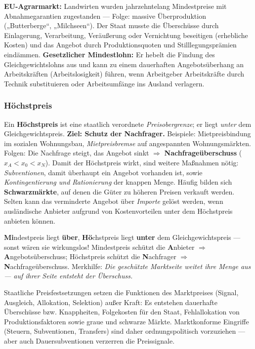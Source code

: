 \documentclass[11pt, a4paper]{article}
\begin{document}
\begin{beispiel}
\textbf{EU-Agrarmarkt:} Landwirten wurden jahrzehntelang Mindestpreise mit
Abnahmegarantien zugestanden --- Folge: massive Überproduktion („Butterberge``,
„Milchseen``). Der Staat musste die Überschüsse durch Einlagerung, Verarbeitung,
Veräußerung oder Vernichtung beseitigen (erhebliche Kosten) und das Angebot durch
Produktionsquoten und Stilllegungsprämien eindämmen.
\textbf{Gesetzlicher Mindestlohn:} Er hebelt die Findung des Gleichgewichtslohns aus und
kann zu einem dauerhaften Angebotsüberhang an Arbeitskräften (Arbeitslosigkeit) führen,
wenn Arbeitgeber Arbeitskräfte durch Technik substituieren oder Arbeitsumfänge ins
Ausland verlagern.
\end{beispiel}

\subsubsection{Höchstpreis}

Ein \textbf{Höchstpreis} ist eine staatlich verordnete \emph{Preisobergrenze}; er liegt
\emph{unter} dem Gleichgewichtspreis. \textbf{Ziel: Schutz der Nachfrager.} Beispiele:
Mietpreisbindung im sozialen Wohnungsbau, \emph{Mietpreisbremse} auf angespannten
Wohnungsmärkten. Folgen: Die Nachfrage steigt, das Angebot sinkt $\Rightarrow$
\textbf{Nachfrageüberschuss} ($x_A < x_0 < x_N$). Damit der Höchstpreis wirkt, sind
weitere Maßnahmen nötig: \emph{Subventionen}, damit überhaupt ein Angebot vorhanden ist,
sowie \emph{Kontingentierung und Rationierung} der knappen Menge. Häufig bilden sich
\textbf{Schwarzmärkte}, auf denen die Güter zu höheren Preisen verkauft werden. Selten
kann das verminderte Angebot über \emph{Importe} gelöst werden, wenn ausländische
Anbieter aufgrund von Kostenvorteilen unter dem Höchstpreis anbieten können.

\begin{eselsbruecke}
\textbf{Mi}ndestpreis liegt \textbf{über}, \textbf{Hö}chstpreis liegt \textbf{unter} dem
Gleichgewichtspreis --- sonst wären sie wirkungslos! Mindestpreis schützt die
\textbf{A}nbieter $\Rightarrow$ \textbf{A}ngebotsüberschuss; Höchstpreis schützt die
\textbf{N}achfrager $\Rightarrow$ \textbf{N}achfrageüberschuss. Merkhilfe: \emph{Die
geschützte Marktseite weitet ihre Menge aus --- auf ihrer Seite entsteht der Überschuss.}
\end{eselsbruecke}

\begin{merksatz}[title={\bfseries Beurteilung staatlicher Preiseingriffe (prüfungsrelevant!)}]
Staatliche Preisfestsetzungen setzen die Funktionen des Marktpreises (Signal, Ausgleich,
Allokation, Selektion) außer Kraft: Es entstehen dauerhafte Überschüsse bzw. Knappheiten,
Folgekosten für den Staat, Fehlallokation von Produktionsfaktoren sowie graue und schwarze
Märkte. Marktkonforme Eingriffe (Steuern, Subventionen, Transfers) sind daher
ordnungspolitisch vorzuziehen --- aber auch Dauersubventionen verzerren die Preissignale.
\end{merksatz}
\end{document}
